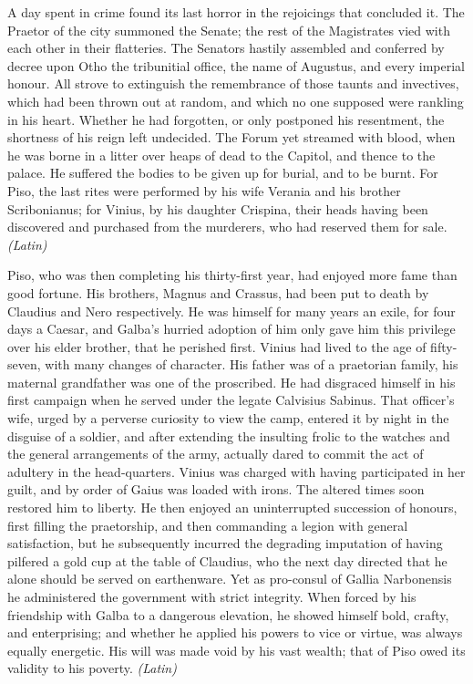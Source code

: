 
A day spent in crime found its last horror in the rejoicings that concluded it. The Praetor of the city summoned the Senate; the rest of the Magistrates vied with each other in their flatteries. The Senators hastily assembled and conferred by decree upon Otho the tribunitial office, the name of Augustus, and every imperial honour. All strove to extinguish the remembrance of those taunts and invectives, which had been thrown out at random, and which no one supposed were rankling in his heart. Whether he had forgotten, or only postponed his resentment, the shortness of his reign left undecided. The Forum yet streamed with blood, when he was borne in a litter over heaps of dead to the Capitol, and thence to the palace. He suffered the bodies to be given up for burial, and to be burnt. For Piso, the last rites were performed by his wife Verania and his brother Scribonianus; for Vinius, by his daughter Crispina, their heads having been discovered and purchased from the murderers, who had reserved them for sale. \emph{(Latin)}


Piso, who was then completing his thirty-first year, had enjoyed more fame than good fortune. His brothers, Magnus and Crassus, had been put to death by Claudius and Nero respectively. He was himself for many years an exile, for four days a Caesar, and Galba's hurried adoption of him only gave him this privilege over his elder brother, that he perished first. Vinius had lived to the age of fifty-seven, with many changes of character. His father was of a praetorian family, his maternal grandfather was one of the proscribed. He had disgraced himself in his first campaign when he served under the legate Calvisius Sabinus. That officer's wife, urged by a perverse curiosity to view the camp, entered it by night in the disguise of a soldier, and after extending the insulting frolic to the watches and the general arrangements of the army, actually dared to commit the act of adultery in the head-quarters. Vinius was charged with having participated in her guilt, and by order of Gaius was loaded with irons. The altered times soon restored him to liberty. He then enjoyed an uninterrupted succession of honours, first filling the praetorship, and then commanding a legion with general satisfaction, but he subsequently incurred the degrading imputation of having pilfered a gold cup at the table of Claudius, who the next day directed that he alone should be served on earthenware. Yet as pro-consul of Gallia Narbonensis he administered the government with strict integrity. When forced by his friendship with Galba to a dangerous elevation, he showed himself bold, crafty, and enterprising; and whether he applied his powers to vice or virtue, was always equally energetic. His will was made void by his vast wealth; that of Piso owed its validity to his poverty. \emph{(Latin)}

